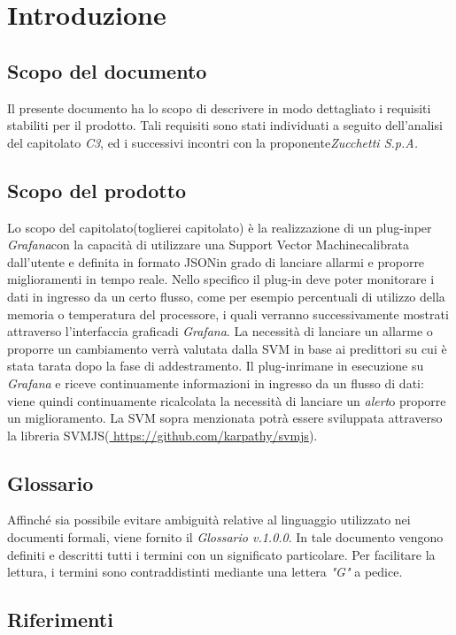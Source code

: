 \section{Introduzione}
	\subsection{Scopo del documento}
		Il presente documento ha lo scopo di descrivere in modo dettagliato i requisiti stabiliti per il prodotto. Tali requisiti sono stati individuati a seguito dell'analisi del capitolato \emph{C3}, ed i successivi incontri con la proponente\glo \emph{Zucchetti S.p.A.}

	
\subsection{Scopo del prodotto}
   Lo scopo del capitolato(toglierei capitolato) è la realizzazione di un plug-in\glo per \emph{Grafana}\glo con la capacità di utilizzare una Support Vector Machine\glo calibrata dall'utente e definita in formato JSON\glo in grado di lanciare allarmi e proporre miglioramenti in tempo reale\glo.
Nello specifico il plug-in deve poter monitorare i dati in ingresso da un certo flusso, come per esempio percentuali di utilizzo della memoria o temperatura del processore, i quali verranno successivamente mostrati attraverso l'interfaccia grafica\glo di \emph{Grafana}.
La necessità di lanciare un allarme o proporre un cambiamento verrà valutata dalla SVM in base ai predittori su cui è stata tarata dopo la fase di addestramento.
Il plug-in\glo rimane in esecuzione su \emph{Grafana} e riceve continuamente informazioni in ingresso da un flusso di dati: viene quindi continuamente ricalcolata la necessità di lanciare un \emph{alert}\glo o proporre un miglioramento.
La SVM sopra menzionata potrà essere sviluppata attraverso la libreria SVMJS\glo (\url{ https://github.com/karpathy/svmjs}).
	
	\subsection{Glossario}
		Affinché sia possibile evitare ambiguità relative al linguaggio utilizzato nei documenti formali, viene fornito il \emph{Glossario v.1.0.0}. In tale documento vengono definiti e descritti tutti i termini con un significato particolare. Per facilitare la lettura, i termini sono contraddistinti mediante una lettera \emph{"G"} a pedice.
		
	\subsection{Riferimenti}
